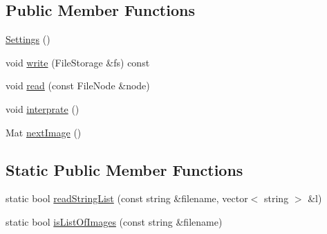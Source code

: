 \subsection*{Public Member Functions}
\begin{DoxyCompactItemize}
\item 
\mbox{\hyperlink{class_settings_ab7169a6eefce79566dd07db3b1e5e967}{Settings}} ()
\item 
void \mbox{\hyperlink{class_settings_a0785cc2055091b2a857b1dcefe291acc}{write}} (File\+Storage \&fs) const
\item 
void \mbox{\hyperlink{class_settings_a2d7841f8441095032e0f3b7d20adfd3f}{read}} (const File\+Node \&node)
\item 
void \mbox{\hyperlink{class_settings_ac01c17bf3536e296f1076e50cdcb00cd}{interprate}} ()
\item 
Mat \mbox{\hyperlink{class_settings_a7701462e928f2425b342440fba9973e5}{next\+Image}} ()
\end{DoxyCompactItemize}
\subsection*{Static Public Member Functions}
\begin{DoxyCompactItemize}
\item 
static bool \mbox{\hyperlink{class_settings_ae57696cead99c4f0c528e33793866457}{read\+String\+List}} (const string \&filename, vector$<$ string $>$ \&l)
\item 
static bool \mbox{\hyperlink{class_settings_ae7696860215ac20c48a5e7121c5dd32e}{is\+List\+Of\+Images}} (const string \&filename)
\end{DoxyCompactItemize}
